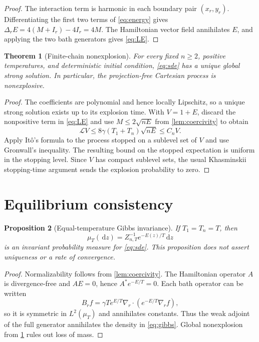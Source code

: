 \documentclass[11pt]{article}
\newtheorem{theorem}{Theorem}[section]
\newtheorem{proposition}[theorem]{Proposition}
\theoremstyle{remark}
\newcommand{\dd}{\,\mathrm d}
\newcommand{\grad}{\nabla}
\newcommand{\cL}{\mathcal L}
\begin{document}
\begin{proof}
The interaction term is harmonic in each boundary pair $(x_r,y_r)$.
Differentiating the first two terms of \eqref{eq:energy} gives
$\Delta_rE=4(M+I_r)-4I_r=4M$.  The Hamiltonian vector field annihilates
$E$, and applying the two bath generators gives \eqref{eq:LE}.
\end{proof}

\begin{theorem}[Finite-chain nonexplosion]\label{thm:nonexplosion}
For every fixed $n\ge2$, positive temperatures, and deterministic initial
condition, \eqref{eq:sde} has a unique global strong solution.  In particular,
the projection-free Cartesian process is nonexplosive.
\end{theorem}

\begin{proof}
The coefficients are polynomial and hence locally Lipschitz, so a unique
strong solution exists up to its explosion time.  With $V=1+E$, discard the
nonpositive term in \eqref{eq:LE} and use
$M\le2\sqrt{nE}$ from \cref{lem:coercivity} to obtain
\[
 \cL V\le 8\gamma(T_1+T_n)\sqrt{nE}\le C_nV.
\]
Apply It\^o's formula to the process stopped on a sublevel set of $V$ and use
Gronwall's inequality.  The resulting bound on the stopped expectation is
uniform in the stopping level.  Since $V$ has compact sublevel sets, the usual
Khasminskii stopping-time argument sends the explosion probability to zero.
\end{proof}

\section{Equilibrium consistency}

\begin{proposition}[Equal-temperature Gibbs invariance]\label{prop:gibbs}
If $T_1=T_n=T$, then
\begin{equation}\label{eq:gibbs}
 \mu_T(\dd z)=Z_{n,T}^{-1}e^{-E(z)/T}\dd z
\end{equation}
is an invariant probability measure for \eqref{eq:sde}.  This proposition does
not assert uniqueness or a rate of convergence.
\end{proposition}

\begin{proof}
Normalizability follows from \cref{lem:coercivity}.  The Hamiltonian operator
$A$ is divergence-free and $AE=0$, hence $A^*e^{-E/T}=0$.  Each bath operator
can be written
\[
 B_rf=\gamma T e^{E/T}\grad_r\cdot
       \left(e^{-E/T}\grad_rf\right),
\]
so it is symmetric in $L^2(\mu_T)$ and annihilates constants.  Thus the weak
adjoint of the full generator annihilates the density in \eqref{eq:gibbs}.
Global nonexplosion from \cref{thm:nonexplosion} rules out loss of mass.
\end{proof}
\end{document}
